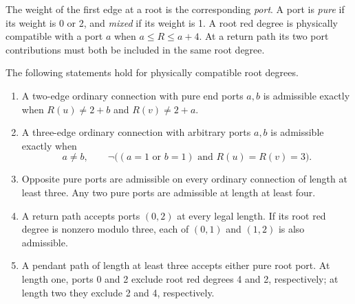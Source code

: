 The weight of the first edge at a root is the corresponding \emph{port}.
A port is \emph{pure} if its weight is 0 or 2, and \emph{mixed} if its
weight is 1.  A root red degree is physically compatible with a port $a$
when $a\le R\le a+4$.  At a return path its two port contributions must
both be included in the same root degree.

\begin{lemma}\label{lem:path}
The following statements hold for physically compatible root degrees.
\begin{enumerate}
\item A two-edge ordinary connection with pure end ports $a,b$ is
admissible exactly when $R(u)\ne2+b$ and $R(v)\ne2+a$.
\item A three-edge ordinary connection with arbitrary ports $a,b$ is
admissible exactly when
\begin{equation}\label{eq:three}
 a\ne b,\qquad
 \neg\bigl((a=1\text{ or }b=1)\text{ and }R(u)=R(v)=3\bigr).
\end{equation}
\item Opposite pure ports are admissible on every ordinary connection of
length at least three.  Any two pure ports are admissible at length at
least four.
\item A return path accepts ports $(0,2)$ at every legal length.  If its
root red degree is nonzero modulo three, each of $(0,1)$ and $(1,2)$ is
also admissible.
\item A pendant path of length at least three accepts either pure root
port.  At length one, ports 0 and 2 exclude root red degrees 4 and 2,
respectively; at length two they exclude 2 and 4, respectively.
\end{enumerate}
\end{lemma}
